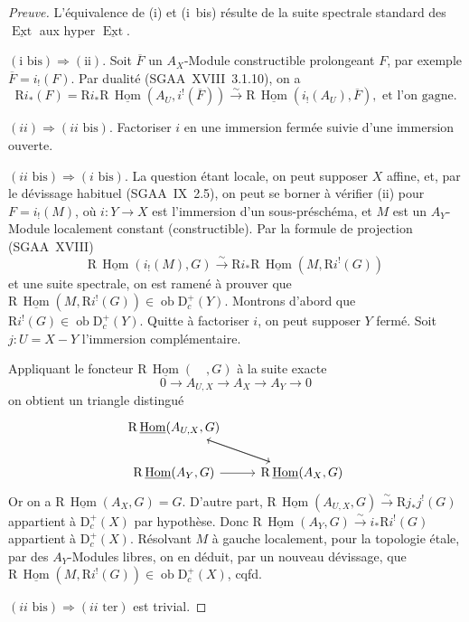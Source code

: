 \documentclass[11pt]{article}
\DeclareMathOperator{\Hom}{Hom}
\DeclareMathOperator{\Ext}{Ext}
\newcommand{\R}{\mathrm{R}}
\newcommand{\D}{\mathrm{D}}
\newcommand{\ob}{\operatorname{ob}}
\newcommand{\ol}[1]{\overline{#1}}
\providecommand{\Hom}{\operatorname{Hom}}
\providecommand{\ob}{\operatorname{ob}}
\begin{document}
\begin{proof}[Preuve]
L'équivalence de (i) et (i~bis) résulte de la suite spectrale standard des $\underline{\Ext}$ aux hyper $\underline{\Ext}$.

$(\text{i~bis}) \Rightarrow (\text{ii})$. Soit $\ol{F}$ un $A_X$-Module constructible prolongeant $F$, par exemple $\ol{F} = i_{!}(F)$. Par dualité (SGAA~XVIII~3.1.10), on a
\[
\R i_{*}(F) = \R i_{*} \R\,\underline{\Hom}(A_U, i^{!}(\ol{F})) \xrightarrow{\sim} \R\,\underline{\Hom}(i_{!}(A_U), \ol{F}), \text{ et l'on gagne.}
\]

$(ii) \Rightarrow (ii\text{~bis})$. Factoriser $i$ en une immersion fermée suivie d'une immersion ouverte.

$(ii\text{~bis}) \Rightarrow (i\text{~bis})$. La question étant locale, on peut supposer $X$ affine, et, par le dévissage habituel (SGAA~IX~2.5), on peut se borner à vérifier (ii) pour $F = i_{!}(M)$, où $i : Y \to X$ est l'immersion d'un sous-préschéma, et $M$ est un $A_Y$-Module localement constant (constructible). Par la formule de projection (SGAA~XVIII)
\[
\R\,\underline{\Hom}(i_{!}(M), G) \xrightarrow{\sim} \R i_{*} \R\,\underline{\Hom}(M, \R i^{!}(G))
\]
et une suite spectrale, on est ramené à prouver que $\R\,\underline{\Hom}(M, \R i^{!}(G)) \in \ob \D_c^{+}(Y)$. Montrons d'abord que $\R i^{!}(G) \in \ob \D_c^{+}(Y)$. Quitte à factoriser $i$, on peut supposer $Y$ fermé. Soit $j : U = X - Y$ l'immersion complémentaire.

Appliquant le foncteur $\R\,\underline{\Hom}(\quad, G)$ à la suite exacte
\[
0 \longrightarrow A_{U,X} \longrightarrow A_X \longrightarrow A_Y \longrightarrow 0
\]
on obtient un triangle distingué
\[
\begin{tikzcd}
\R\,\underline{\Hom}(A_{U,X}, G) \ar[dr] & \\
\R\,\underline{\Hom}(A_Y, G) \ar[r] & \R\,\underline{\Hom}(A_X, G) \ar[ul]
\end{tikzcd}
\]
Or on a $\R\,\underline{\Hom}(A_X, G) = G$. D'autre part, $\R\,\underline{\Hom}(A_{U,X}, G) \xrightarrow{\sim} \R j_{*} j^{!}(G)$ appartient à $\D_c^{+}(X)$ par hypothèse. Donc $\R\,\underline{\Hom}(A_Y, G) \xrightarrow{\sim} i_{*} \R i^{!}(G)$ appartient à $\D_c^{+}(X)$. Résolvant $M$ à gauche localement, pour la topologie étale, par des $A_Y$-Modules libres, on en déduit, par un nouveau dévissage, que $\R\,\underline{\Hom}(M, \R i^{!}(G)) \in \ob \D_c^{+}(X)$, cqfd.

$(ii\text{~bis}) \Rightarrow (ii\text{~ter})$ est trivial.


\end{proof}
\end{document}
